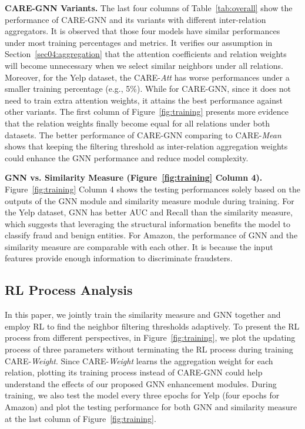 \vspace{1mm}
\noindent \textbf{CARE-GNN Variants.}
The last four columns of Table~\ref{tab:overall} show the performance of CARE-GNN and its variants with different inter-relation aggregators.
It is observed that those four models have similar performances under most training percentages and metrics.
It verifies our assumption in Section~\ref{sec04:aggregation} that the attention coefficients and relation weights will become unnecessary when we select similar neighbors under all relations.
Moreover, for the Yelp dataset, the CARE-\textit{Att} has worse performances under a smaller training percentage (e.g., 5\%).
While for CARE-GNN, since it does not need to train extra attention weights, it attains the best performance against other variants. 
The first column of Figure~\ref{fig:training} presents more evidence that the relation weights finally become equal for all relations under both datasets.
The better performance of CARE-GNN comparing to CARE-\textit{Mean} shows that keeping the filtering threshold as inter-relation aggregation weights could enhance the GNN performance and reduce model complexity.

\vspace{1mm}
\noindent \textbf{GNN vs. Similarity Measure (Figure~\ref{fig:training} Column 4).}
Figure~\ref{fig:training} Column 4 shows the testing performances solely based on the outputs of the GNN module and similarity measure module during training.
For the Yelp dataset, GNN has better AUC and Recall than the similarity measure, which suggests that leveraging the structural information benefits the model to classify fraud and benign entities. 
For Amazon, the performance of GNN and the similarity measure are comparable with each other.
It is because the input features provide enough information to discriminate fraudsters.



\subsection{RL Process Analysis}
\label{sec05:training_analysis}

In this paper, we jointly train the similarity measure and GNN together and employ RL to find the neighbor filtering thresholds adaptively.
To present the RL process from different perspectives, in Figure~\ref{fig:training}, we plot the updating process of three parameters without terminating the RL process during training CARE-\textit{Weight}.
Since CARE-\textit{Weight} learns the aggregation weight for each relation, plotting its training process instead of CARE-GNN could help understand the effects of our proposed GNN enhancement modules.
During training, we also test the model every three epochs for Yelp (four epochs for Amazon) and plot the testing performance for both GNN and similarity measure at the last column of Figure~\ref{fig:training}.


